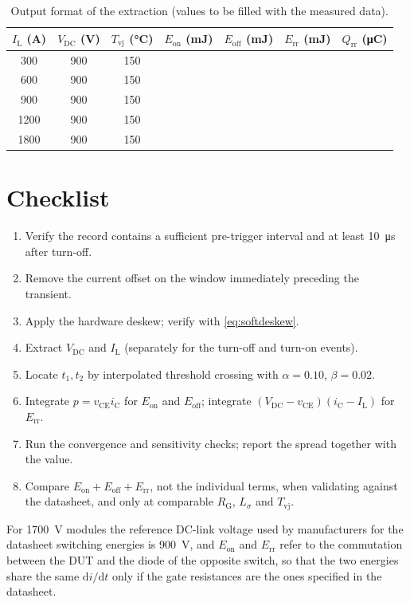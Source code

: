 \documentclass[11pt,a4paper]{article}
\newcommand{\Eon}{E_{\mathrm{on}}}
\newcommand{\Eoff}{E_{\mathrm{off}}}
\newcommand{\Err}{E_{\mathrm{rr}}}
\newcommand{\vce}{v_{\mathrm{CE}}}
\newcommand{\ic}{i_{\mathrm{C}}}
\newcommand{\Vdc}{V_{\mathrm{DC}}}
\newcommand{\IL}{I_{\mathrm{L}}}
\begin{document}
\begin{table}[htbp]
\centering
\caption{Output format of the extraction (values to be filled with the measured data).}
\label{tab:out}
\begin{tabular}{ccccccc}
\toprule
$\IL$ (\si{\ampere}) & $\Vdc$ (\si{\volt}) & $T_{\mathrm{vj}}$ (\si{\celsius}) &
$\Eon$ (\si{\milli\joule}) & $\Eoff$ (\si{\milli\joule}) &
$\Err$ (\si{\milli\joule}) & $Q_{\mathrm{rr}}$ (\si{\micro\coulomb}) \\
\midrule
300  & 900 & 150 & & & & \\
600  & 900 & 150 & & & & \\
900  & 900 & 150 & & & & \\
1200 & 900 & 150 & & & & \\
1800 & 900 & 150 & & & & \\
\bottomrule
\end{tabular}
\end{table}

\section{Checklist}

\begin{enumerate}
\item Verify the record contains a sufficient pre-trigger interval and at least
\SI{10}{\micro\second} after turn-off.
\item Remove the current offset on the window immediately preceding the transient.
\item Apply the hardware deskew; verify with \eqref{eq:softdeskew}.
\item Extract $\Vdc$ and $\IL$ (separately for the turn-off and turn-on events).
\item Locate $t_1,t_2$ by interpolated threshold crossing with $\alpha=0.10$,
$\beta=0.02$.
\item Integrate $p=\vce\ic$ for $\Eon$ and $\Eoff$; integrate
$(\Vdc-\vce)(\ic-\IL)$ for $\Err$.
\item Run the convergence and sensitivity checks; report the spread together with the
value.
\item Compare $\Eon+\Eoff+\Err$, not the individual terms, when validating against the
datasheet, and only at comparable $R_{\mathrm{G}}$, $L_\sigma$ and $T_{\mathrm{vj}}$.
\end{enumerate}

For \SI{1700}{\volt} modules the reference DC-link voltage used by manufacturers for the
datasheet switching energies is \SI{900}{\volt}, and $\Eon$ and $\Err$ refer to the
commutation between the DUT and the diode of the opposite switch, so that the two
energies share the same $\mathrm{d}i/\mathrm{d}t$ only if the gate resistances are the
ones specified in the datasheet.
\end{document}
